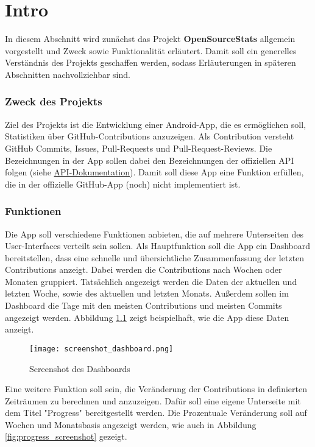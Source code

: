 \chapter{Intro}
\label{ch:Intro}

In diesem Abschnitt wird zunächst das Projekt \textbf{OpenSourceStats} allgemein vorgestellt und Zweck sowie Funktionalität erläutert.
Damit soll ein generelles Verständnis des Projekts geschaffen werden, sodass Erläuterungen in späteren Abschnitten nachvollziehbar sind.
\subsection*{Zweck des Projekts}
Ziel des Projekts ist die Entwicklung einer Android-App, die es ermöglichen soll, Statistiken über GitHub-Contributions anzuzeigen.
Als Contribution versteht GitHub Commits, Issues, Pull-Requests und Pull-Request-Reviews.
Die Bezeichnungen in der App sollen dabei den Bezeichnungen der offiziellen API folgen (siehe \href{https://docs.github.com/en/graphql/reference/objects#contributionscollection}{API-Dokumentation}).
Damit soll diese App eine Funktion erfüllen, die in der offizielle GitHub-App (noch) nicht implementiert ist.
\subsection*{Funktionen}
Die App soll verschiedene Funktionen anbieten, die auf mehrere Unterseiten des User-Interfaces verteilt sein sollen.
Als Hauptfunktion soll die App ein Dashboard bereitstellen, dass eine schnelle und übersichtliche Zusammenfassung der letzten Contributions anzeigt.
Dabei werden die Contributions nach Wochen oder Monaten gruppiert.
Tatsächlich angezeigt werden die Daten der aktuellen und letzten Woche, sowie des aktuellen und letzten Monats.
Außerdem sollen im Dashboard die Tage mit den meisten Contributions und meisten Commits angezeigt werden.
Abbildung \ref{fig:dashboard_screenshot} zeigt beispielhaft, wie die App diese Daten anzeigt.

\begin{figure}
    \texttt{[image: screenshot\_dashboard.png]}
    \centering
    \caption{Screenshot des Dashboards}
    \label{fig:dashboard_screenshot}
\end{figure}
Eine weitere Funktion soll sein, die Veränderung der Contributions in definierten Zeiträumen zu berechnen und anzuzeigen.
Dafür soll eine eigene Unterseite mit dem Titel "Progress" bereitgestellt werden.
Die Prozentuale Veränderung soll auf Wochen und Monatsbasis angezeigt werden, wie auch in Abbildung \ref{fig:progress_screenshot} gezeigt.

